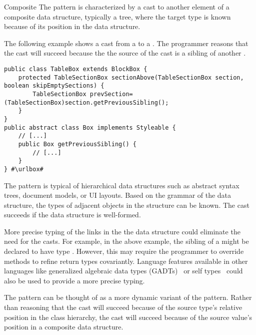 \begin{pattern}{Composite}
The \thisp{} pattern is characterized by a cast to another element of a
composite data structure, typically a tree, where the target type is known because of its
position in the data structure.

\instances{}
The following example
shows a cast from a  to a .
The programmer reasons that the cast will succeed because the 
the source of the cast is a sibling of another .

\def\urlvar{http://bit.ly/flyingsaucerproject_flyingsaucer_2N2nYbY}
\begin{verbatim}
public class TableBox extends BlockBox {
    protected TableSectionBox sectionAbove(TableSectionBox section, boolean skipEmptySections) {
        TableSectionBox prevSection=(TableSectionBox)section.getPreviousSibling();
    }
}
public abstract class Box implements Styleable {
    // [...]
    public Box getPreviousSibling() {
        // [...]
    }
} #\urlbox#
\end{verbatim}

\issues{}
The pattern is typical of hierarchical data structures such as abstract syntax
trees, document models, or UI layouts. Based on the grammar of 
the data structure, the types of adjacent objects in the structure can be known.
The cast succeeds if the data structure is well-formed.

More precise typing of the links in the the data structure could 
eliminate the need for the casts. For example, in the above example,
the sibling of a  might be declared to have type
. However, this may require the programmer to override
methods to refine return types covariantly.
Language features available in other languages like generalized algebraic data types
  (GADTs)~\cite{gadts} or self types~\cite{bruceChallengingTypingIssues2003,scalaIndependentlyExtensible} could also be 
used to provide a more precise typing.

The pattern can be thought of as a more dynamic variant of the
 pattern. Rather than
reasoning that the cast will succeed because of the source type's relative position in the 
class hierarchy, the cast will succeed because of the source value's position
in a composite data structure.

\end{pattern}
